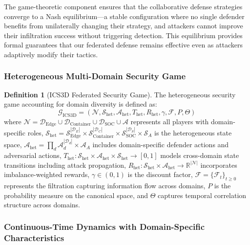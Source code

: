 \documentclass[12pt,a4paper]{article}
\theoremstyle{definition}
\newtheorem{definition}[theorem]{Definition}
\newcommand{\R}{\mathbb{R}}
\newcommand{\D}{\mathcal{D}}
\newcommand{\A}{\mathcal{A}}
\newcommand{\N}{\mathcal{N}}
\newcommand{\S}{\mathcal{S}}
\newcommand{\G}{\mathcal{G}}
\newcommand{\F}{\mathcal{F}}
\begin{document}
The game-theoretic component ensures that the collaborative defense strategies converge to a Nash equilibrium—a stable configuration where no single defender benefits from unilaterally changing their strategy, and attackers cannot improve their infiltration success without triggering detection. This equilibrium provides formal guarantees that our federated defense remains effective even as attackers adaptively modify their tactics.

\subsubsection{Heterogeneous Multi-Domain Security Game}

\begin{definition}[ICS3D Federated Security Game]
\label{def:federated_game}
The heterogeneous security game accounting for domain diversity is defined as:
\begin{equation}
\G_{\text{ICS3D}} = (\N, \S_{\text{het}}, \A_{\text{het}}, T_{\text{het}}, R_{\text{het}}, \gamma, \F, P, \Theta)
\end{equation}
where $\N = \D_{\text{Edge}} \cup \D_{\text{Container}} \cup \D_{\text{SOC}} \cup \A$ represents all players with domain-specific roles, $\S_{\text{het}} = \S_{\text{Edge}}^{|\D_E|} \times \S_{\text{Container}}^{|\D_C|} \times \S_{\text{SOC}}^{|\D_S|} \times \S_A$ is the heterogeneous state space, $\A_{\text{het}} = \prod_{d} \A_d^{|\D_d|} \times \A_A$ includes domain-specific defender actions and adversarial actions, $T_{\text{het}}: \S_{\text{het}} \times \A_{\text{het}} \times \S_{\text{het}} \rightarrow [0,1]$ models cross-domain state transitions including attack propagation, $R_{\text{het}}: \S_{\text{het}} \times \A_{\text{het}} \rightarrow \R^{|\N|}$ incorporates imbalance-weighted rewards, $\gamma \in (0,1)$ is the discount factor, $\F = \{\F_t\}_{t \geq 0}$ represents the filtration capturing information flow across domains, $P$ is the probability measure on the canonical space, and $\Theta$ captures temporal correlation structure across domains.
\end{definition}

\subsubsection{Continuous-Time Dynamics with Domain-Specific Characteristics}
\end{document}
